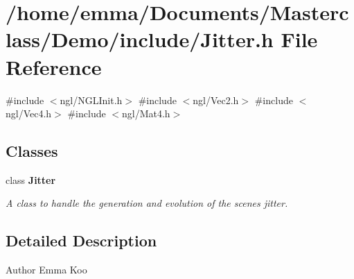 \section{/home/emma/\+Documents/\+Masterclass/\+Demo/include/\+Jitter.h File Reference}
\label{_jitter_8h}
{\ttfamily \#include $<$ngl/\+N\+G\+L\+Init.\+h$>$}\newline
{\ttfamily \#include $<$ngl/\+Vec2.\+h$>$}\newline
{\ttfamily \#include $<$ngl/\+Vec4.\+h$>$}\newline
{\ttfamily \#include $<$ngl/\+Mat4.\+h$>$}\newline
\subsection*{Classes}
\begin{DoxyCompactItemize}
\item 
class \textbf{ Jitter}
\begin{DoxyCompactList}\small\item\em A class to handle the generation and evolution of the scene\textquotesingle{}s jitter. \end{DoxyCompactList}\end{DoxyCompactItemize}


\subsection{Detailed Description}
\begin{DoxyAuthor}{Author}
Emma Koo 
\end{DoxyAuthor}
